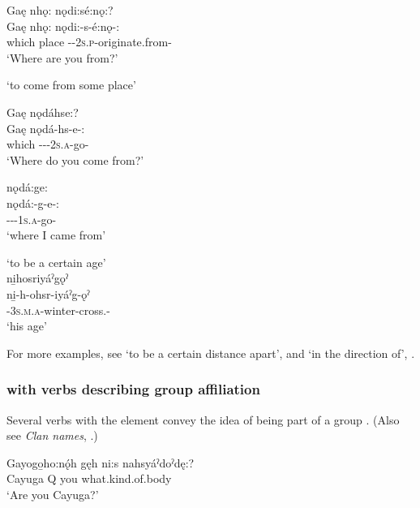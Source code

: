 \ex Gaę nhǫ: nǫdi:sé:nǫ:?  \\
\gll Gaę nhǫ: nǫdi:-s-é:nǫ-:\\
which place {\partitive}-{\cislocative}-\textsc{2s.p}-originate.from-{\stative}\\
\glt ‘Where are you from?’
\z
\z

\ea\label{ex:niex25}  ‘to come from some place’ 

\ea Gaę nǫdáhse:? \\
\gll Gaę nǫdá-hs-e-:\\
which {\partitive}-{\factual}-{\cislocative}-\textsc{2s.a}-go-{\purposive}\\
\glt ‘Where do you come from?’

\ex nǫdá:ge:\\
\gll nǫdá:-g-e-:\\
{\partitive}-{\factual}-{\cislocative}-\textsc{1s.a}-go-{\purposive}\\
\glt `where I came from'
\z
\z

\ea\label{ex:niex26}  ‘to be a certain age’\\
ni̱hosriyáˀgǫˀ\\
\gll ni̱-h-ohsr-iyáˀg-ǫˀ\\
{\partitive}-\textsc{3s.m.a}-winter-cross.{\stative}-\\
\glt `his age'
\z

For more examples, see  ‘to be a certain distance apart’,  and  ‘in the direction of’, .


\subsubsection*{ \textsc{\partitive} with verbs describing group affiliation} \label{[ni-] (partitive) with verbs describing group affiliation}
Several verbs with the  \textsc{\partitive} element convey the idea of being part of a group . (Also see \textit{Clan names}, .)

\ea\label{ex:niex2} 
\ea
\gll Gayogo̱ho:nǫ́h gęh ni:s nahsyáˀdoˀdę:? \\
Cayuga Q you what.kind.of.body \\
\glt ‘Are you Cayuga?’ 

